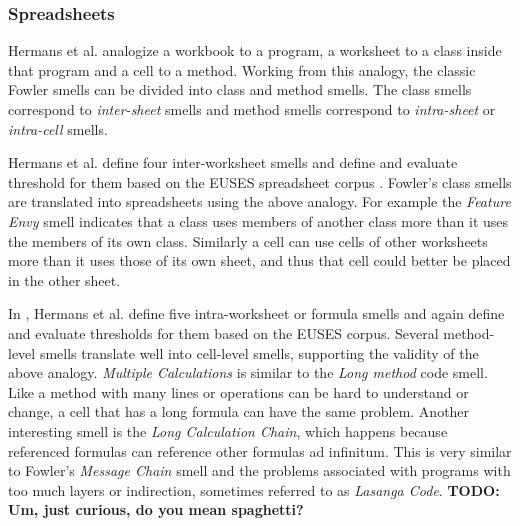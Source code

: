 \documentclass[10pt,conference,compsocconf]{IEEEtran}
\newcommand{\todo}[1]{\textbf{TODO: #1}}
\begin{document}
 \subsubsection{Spreadsheets}
Hermans et al. \cite{Hermans2012inter} \cite{Hermans2012intra} analogize a workbook to a program, a worksheet to a class inside that program and a cell to a method.
Working from this analogy, the classic Fowler smells can be divided into class and method smells.
The class smells correspond to \textit{inter-sheet} smells and method smells correspond to \textit{intra-sheet} or \textit{intra-cell} smells.

Hermans et al. \cite{Hermans2012inter} define four inter-worksheet smells and define and evaluate threshold for them based on the EUSES spreadsheet corpus \cite{fisher2005euses}.
Fowler's class smells are translated into spreadsheets using the above analogy. 
For example the \textit{Feature Envy} smell indicates that a class uses members of another class more than it uses the members of its own class.
Similarly a cell can use cells of other worksheets more than it uses those of its own sheet, and thus that cell could better be placed in the other sheet.

In \cite{Hermans2012intra}, Hermans et al. define five intra-worksheet or formula smells and again define and evaluate thresholds for them based on the EUSES corpus.
Several method-level smells translate well into cell-level smells, supporting the validity of the above analogy.
\textit{Multiple Calculations} is similar to the \textit{Long method} code smell.
Like a method with many lines or operations can be hard to understand or change, a cell that has a long formula can have the same problem.
Another interesting smell is the \textit{Long Calculation Chain}, which happens because referenced formulas can reference other formulas ad infinitum.
This is very similar to Fowler's \textit{Message Chain} smell and the problems associated with programs with too much layers or indirection, sometimes referred to as \textit{Lasanga Code}. \todo{Um, just curious, do you mean spaghetti?}

%
\end{document}
